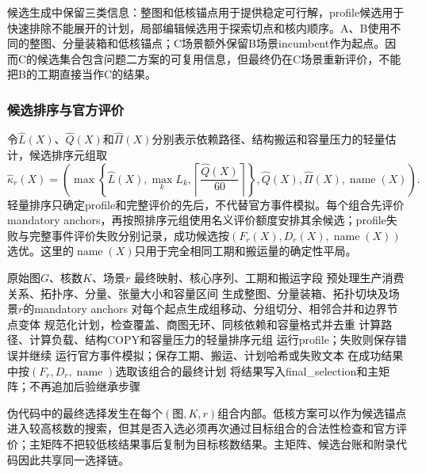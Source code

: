 候选生成中保留三类信息：整图和低核锚点用于提供稳定可行解，profile候选用于快速排除不能展开的计划，局部编辑候选用于探索切点和核内顺序。A、B使用不同的整图、分量装箱和低核锚点；C场景额外保留B场景incumbent作为起点。因而C的候选集合包含问题二方案的可复用信息，但最终仍在C场景重新评价，不能把B的工期直接当作C的结果。

\subsubsection{候选排序与官方评价}
令$\widehat L(X)$、$\widehat Q(X)$和$\widehat\Pi(X)$分别表示依赖路径、结构搬运和容量压力的轻量估计，候选排序元组取
\begin{equation}
\widehat\kappa_r(X)=\left(\max\left\{\widehat L(X),\max_k L_k,\left\lceil\frac{\widehat Q(X)}{60}\right\rceil\right\},\widehat Q(X),\widehat\Pi(X),\operatorname{name}(X)\right).
\label{eq:v7-light-score}
\end{equation}
轻量排序只确定profile和完整评价的先后，不代替官方事件模拟。每个组合先评价mandatory anchors，再按照排序元组使用名义评价额度安排其余候选；profile失败与完整事件评价失败分别记录，成功候选按\((F_r(X),D_r(X),\operatorname{name}(X))\)选优。这里的$\operatorname{name}(X)$只用于完全相同工期和搬运量的确定性平局。

\begin{algorithm}[H]
\caption{问题一场景化候选生成与官方评价}
\begin{algorithmic}[1]
\REQUIRE 原始图$G$、核数$K$、场景$r$
\ENSURE 最终映射、核心序列、工期和搬运字段
\STATE 预处理生产消费关系、拓扑序、分量、张量大小和容量区间
\STATE 生成整图、分量装箱、拓扑切块及场景$r$的mandatory anchors
\STATE 对每个起点生成组移动、分组切分、相邻合并和边界节点变体
\STATE 规范化计划，检查覆盖、商图无环、同核依赖和容量格式并去重
\STATE 计算路径、计算负载、结构COPY和容量压力的轻量排序元组
\STATE 运行profile；失败则保存错误并继续
\STATE 运行官方事件模拟；保存工期、搬运、计划哈希或失败文本
\ENDFOR
\STATE 在成功结果中按$(F_r,D_r,\operatorname{name})$选取该组合的最终计划
\STATE 将结果写入final\_selection和主矩阵；不再追加后验继承步骤
\end{algorithmic}
\end{algorithm}

伪代码中的最终选择发生在每个$(\text{图},K,r)$组合内部。低核方案可以作为候选锚点进入较高核数的搜索，但其是否入选必须再次通过目标组合的合法性检查和官方评价；主矩阵不把较低核结果事后复制为目标核数结果。主矩阵、候选台账和附录代码因此共享同一选择链。

